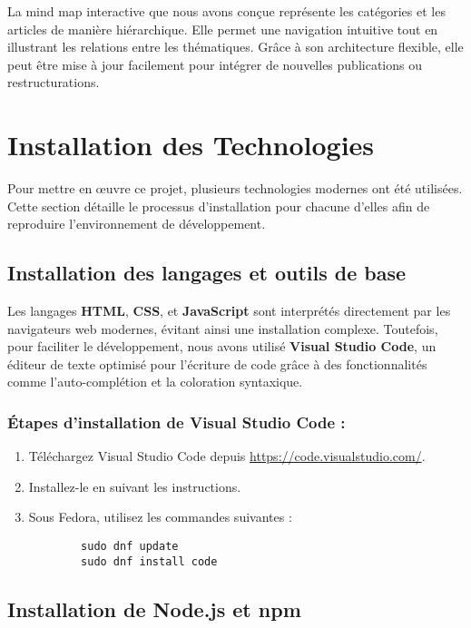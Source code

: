 \documentclass{article}
\begin{document}
La mind map interactive que nous avons conçue représente les catégories et les articles de manière hiérarchique. Elle permet une navigation intuitive tout en illustrant les relations entre les thématiques. Grâce à son architecture flexible, elle peut être mise à jour facilement pour intégrer de nouvelles publications ou restructurations.





\section{Installation des Technologies}

Pour mettre en œuvre ce projet, plusieurs technologies modernes ont été utilisées. Cette section détaille le processus d'installation pour chacune d'elles afin de reproduire l'environnement de développement.

\subsection{Installation des langages et outils de base}

Les langages \textbf{HTML}, \textbf{CSS}, et \textbf{JavaScript} sont interprétés directement par les navigateurs web modernes, évitant ainsi une installation complexe. Toutefois, pour faciliter le développement, nous avons utilisé \textbf{Visual Studio Code}, un éditeur de texte optimisé pour l'écriture de code grâce à des fonctionnalités comme l’auto-complétion et la coloration syntaxique.

\subsubsection*{Étapes d'installation de Visual Studio Code :}
\begin{enumerate}
    \item Téléchargez Visual Studio Code depuis \url{https://code.visualstudio.com/}.
    \item Installez-le en suivant les instructions. 
    \item Sous Fedora, utilisez les commandes suivantes :
    \begin{verbatim}
        sudo dnf update
        sudo dnf install code
    \end{verbatim}
\end{enumerate}

\subsection{Installation de Node.js et npm}
\end{document}

